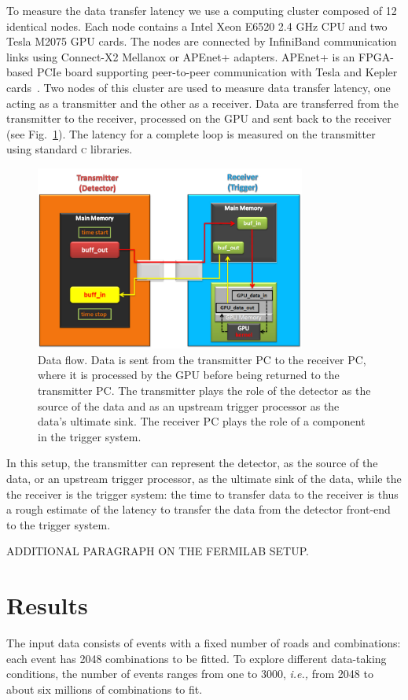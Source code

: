 \documentclass[journal]{IEEEtran}
\begin{document}
To measure the data transfer latency we use a computing cluster composed of 
12 identical nodes.  Each node contains a Intel Xeon E6520 2.4 GHz 
CPU and two Tesla M2075 GPU cards. The nodes are connected by InfiniBand 
communication links using Connect-X2 Mellanox or APEnet+ adapters. 
APEnet+ is an FPGA-based PCIe board supporting peer-to-peer communication with 
Tesla and Kepler cards~\cite{apenet2010}.
Two nodes of this cluster are used to measure data transfer latency,
one acting as a transmitter and the
other as a receiver.  Data are transferred from the transmitter to the 
receiver, processed on the GPU and sent back to the receiver (see
Fig.~\ref{fig:data_flow}).  
The latency for a complete loop is measured on the transmitter using 
standard \textsc{c} libraries.
\begin{figure}[tbp]
\centering
\includegraphics[width=3.5in]{figures/SetUp-general}
\caption{Data flow. Data is sent from the transmitter PC to the
  receiver PC, where it is processed by the GPU before being returned
  to the transmitter PC. The transmitter plays the role of the
  detector as the source of the data and as an upstream trigger
  processor as the data's ultimate sink. The receiver PC plays the
  role of a component in the trigger system. }
\label{fig:data_flow}
\end{figure}
In this setup, the transmitter can represent the detector, as
the source of the data, or an upstream trigger processor, as
the ultimate sink of the data, while the the receiver is the
trigger system: the time to transfer data to the receiver is thus a
rough estimate of the latency to transfer the data from the detector
front-end to the trigger system.

ADDITIONAL PARAGRAPH ON THE FERMILAB SETUP.

\section{Results}
The input data consists of events with a fixed number of roads and
combinations: each event has 2048 combinations to be fitted. To
explore different data-taking conditions, the number of events ranges
from one to 3000, \emph{i.e.,} from 2048 to about six millions of combinations
to fit.
 
\end{document}

